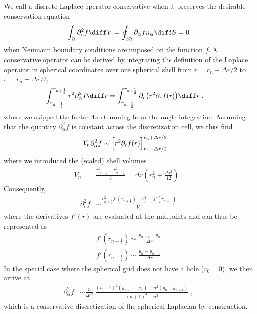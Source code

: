 \documentclass[
	superscriptaddress,
	twocolumn,
	aps, pre
]{revtex4-1}
\newcommand{\dr}{\Delta r}
\begin{document}
We call a discrete Laplace operator conservative when it preserves the desirable conservation equation
\begin{align}
	\int_\Omega \partial_\alpha^2 f \diff V
		= \oint_{\partial\Omega} \partial_\alpha f n_\alpha \diff S= 0
\end{align}
when Neumann boundary conditions are imposed on the function $f$.
A conservative operator can be derived by integrating the definition of the Laplace operator in spherical coordinates over one spherical shell from $r=r_n - \dr/2$ to $r=r_n  + \dr/2$,
\begin{align}
	\int_{r_{n - \frac12}}^{r_{n + \frac12}} r^2 \partial_\alpha^2 f \diff r
		&= \int_{r_{n - \frac12}}^{r_{n + \frac12}} \partial_r\bigl(r^2 \partial_r f(r)\bigr) \diff r
	\;,
\end{align}
where we skipped the factor $4\pi$ stemming from the angle integration.
Assuming that the quantity $\partial_\alpha^2 f$ is constant across the discretization cell, we thus find
\begin{align}
	V_n \partial_\alpha^2 f %
		&\sim \Bigl[r^2 \partial_r f(r)\Bigr]_{r_n - \dr/2}^{r_n + \dr/2}
\end{align}
where we introduced the (scaled) shell volumes
\begin{align}
	V_n &= \frac{r_{n + \frac12}^3 - r_{n - \frac12}^3}{3}
	= \dr \left(	r_n^2 + \frac{\dr^2}{12} \right)
	\label{eqn:spherical_shell_volume}
\;.
\end{align}
Consequently,
\begin{align}
	\partial_\alpha^2 f
		&\sim \frac{r_{n+\frac12}^2 f'\left(r_{n+\frac12}\right) - r_{n-\frac12}^2 f'\left(r_{n-\frac12}\right)}{V_n}
\end{align}
where the derivatives $f'(r)$ are evaluated at the midpoints and can thus be represented as
\begin{subequations}
\begin{align}
	f'\left(r_{n + \frac12}\right) \sim \frac{y_{n+1} - y_n}{\dr}
\\
	f'\left(r_{n - \frac12}\right) \sim \frac{y_n - y_{n-1}}{\dr}
\end{align}
\end{subequations}
In the special case where the spherical grid does not have a hole ($r_0=0$), we then arrive at
\begin{align}
	\partial_\alpha^2 f
		&\sim \frac{3}{\dr^2} \, \frac{(n + 1)^2 (y_{n+1} - y_n) - n^2 (y_n - y_{n-1})}{(n + 1)^3 - n^3}
	\;,
\end{align}
which is a conservative discretization of the spherical Laplacian by construction.
\end{document}
